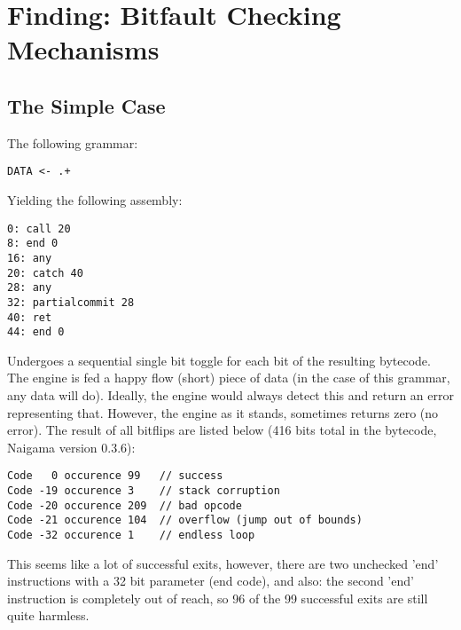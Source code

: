 \section{Finding: Bitfault Checking Mechanisms}

\subsection{The Simple Case}

The following grammar:

\begin{myquote}
\begin{verbatim}
DATA <- .+

\end{verbatim}
\end{myquote}

Yielding the following assembly:

\begin{myquote}
\begin{verbatim}
0: call 20
8: end 0
16: any
20: catch 40
28: any
32: partialcommit 28
40: ret
44: end 0

\end{verbatim}
\end{myquote}

Undergoes a sequential single bit toggle for each bit of the resulting
bytecode. The engine is fed a happy flow (short) piece of data
(in the case of this grammar, any data will do).
Ideally, the engine would always detect this and return an
error representing that. However, the engine as it stands, sometimes
returns zero (no error). The result of all bitflips are listed below
(416 bits total in the bytecode, Naigama version 0.3.6):

\begin{myquote}
\begin{verbatim}
Code   0 occurence 99   // success
Code -19 occurence 3    // stack corruption
Code -20 occurence 209  // bad opcode
Code -21 occurence 104  // overflow (jump out of bounds)
Code -32 occurence 1    // endless loop

\end{verbatim}
\end{myquote}

This seems like a lot of successful exits, however, there are two unchecked
'end' instructions with a 32 bit parameter (end code), and also: the second
'end' instruction is completely out of reach, so 96 of the 99 successful
exits are still quite harmless.

